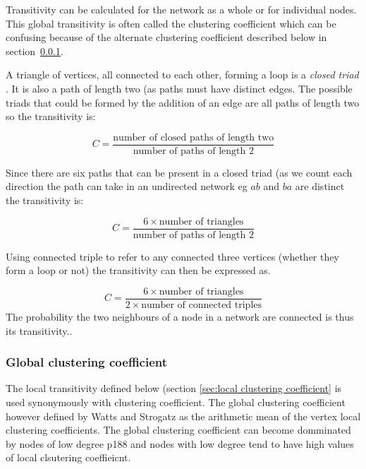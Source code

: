 Transitivity can be calculated for the network as a whole or for individual nodes. This global transitivity is often called the clustering coefficient which can be confusing because of the alternate clustering coefficient described below in section~\ref{sec:Global clustering coefficient}. 

A triangle of vertices,  all connected to each other, forming a loop is  a \textit{closed triad} \cite{newman2018networks}. It is also a path of length two (as paths must have distinct edges. The possible triads that could be formed by the addition of an edge are all paths of length two so the transitivity is:

\begin{equation}
    C = \frac{\textrm{number of closed paths of length two}}{\textrm{number of paths of length 2}}
\end{equation}

Since there are six paths that can be present in a closed triad (as we count each direction the path can take in an undirected network eg $ab$ and $ba$ are distinct the transitivity is:

\begin{equation}
    C = \frac{6 \times \textrm{number of triangles}}{\textrm{number of paths of length 2}}
\end{equation}

Using connected triple to refer to any connected three vertices (whether they form a loop or not) the transitivity can then be expressed as.

\begin{equation}
    C = \frac{6 \times \textrm{number of triangles}}{2 \times \textrm{number of connected triples}}
\end{equation}
The probability the two neighbours of a node in a network are connected is thus its transitivity.\cite{newman2018networks}. 



\subsubsection{Global clustering coefficient}
\label{sec:Global clustering coefficient}
The local transitivity defined below (section \ref{sec:local clustering coefficient} is used synonymously with clustering coefficient. The global clustering coefficient however defined by Watts and Strogatz as the arithmetic mean of the vertex local clustering coefficients. The global clustering coefficient can become domminated by nodes of low degree \cite{newman2018networks} p188 and nodes with low degree tend to have high values of local clsutering coeffieicnt. 

